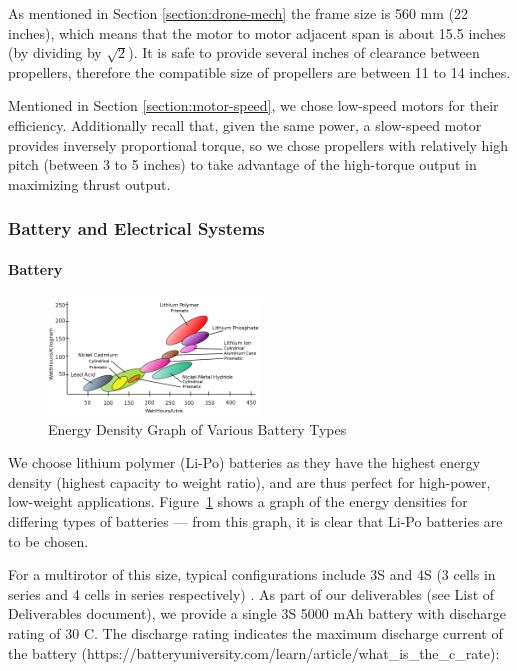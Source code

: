 As mentioned in Section \ref{section:drone-mech} the frame size is 560 mm (22 inches), which means that the motor to motor adjacent span is about 15.5 inches (by dividing by $\sqrt{2}$). It is safe to provide several inches of clearance between propellers, therefore the  compatible size of propellers are between 11 to 14 inches.

Mentioned in Section \ref{section:motor-speed}, we chose low-speed motors for their efficiency. Additionally recall that, given the same power, a slow-speed motor provides inversely proportional torque, so we chose propellers with relatively high pitch (between 3 to 5 inches) to take advantage of the high-torque output in maximizing thrust output.

\subsubsection{Battery and Electrical Systems}

\paragraph{Battery}

\begin{figure}[h]
    \centering
    \includegraphics[width=0.5\textwidth]{img/energydensity.png}
    \caption{Energy Density Graph of Various Battery Types}
    \label{fig:batterytypes}
\end{figure}

We choose lithium polymer (Li-Po) batteries as they have the highest energy density (highest capacity to weight ratio), and are thus  perfect for high-power, low-weight applications. Figure~\ref{fig:batterytypes} shows a graph of the energy densities for differing types of batteries \cite{battery} --- from this graph, it is clear that Li-Po batteries are to be chosen.

For a multirotor of this size, typical configurations include 3S and 4S (3 cells in series and 4 cells in series respectively) . As part of our deliverables (see List of Deliverables document), we provide a single 3S 5000 mAh battery with discharge rating of 30 C. The discharge rating indicates the maximum discharge current of the battery (https://batteryuniversity.com/learn/article/what_is_the_c_rate):


